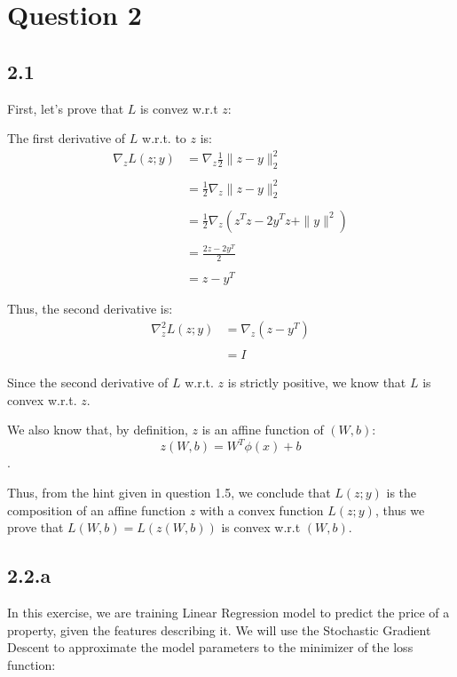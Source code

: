 \documentclass[10pt]{article}
\begin{document}
\newpage
\section{Question 2}
\subsection{2.1}
First, let's prove that $L$ is convez w.r.t $z$:

The first derivative of $L$ w.r.t. to $z$ is:
\begin{equation}
\begin{aligned}
  \nabla_{z} L(z; y) {} & = \nabla_{z}\frac{1}{2}\|z-y\|^{2}_{2}
  \\ \\ &
  = \frac{1}{2} \nabla_{z}\|z-y\|^{2}_{2}
  \\ \\ &
  = \frac{1}{2} \nabla_{z}(z^{T}z - 2y^{T}z + \|y\|^{2})
  \\ \\ &
  = \frac{2z - 2y^{T}}{2}
  \\ \\ &
  = z - y^{T}
\end{aligned}
\end{equation}

Thus, the second derivative is:
\begin{equation}
\begin{aligned}
  \nabla^{2}_{z} L(z; y) {} & = \nabla_{z}(z - y^{T})
  \\ \\ &
  = I
\end{aligned}
\end{equation}

Since the second derivative of $L$ w.r.t. $z$ is strictly positive, we know that $L$ is convex w.r.t. $z$.

We also know that, by definition, $z$ is an affine function of $(W, b)$: $$z(W, b) = W^{T}\phi(x) + b$$.

Thus, from the hint given in question 1.5, we conclude that $L(z; y)$ is the composition of an affine function $z$ with a convex function $L(z; y)$, thus we prove that $L(W, b) = L(z(W, b))$ is convex w.r.t $(W, b)$.

\newpage
\subsection{2.2.a}

In this exercise, we are training Linear Regression model to predict the price of a property, given the features describing it. We will use the Stochastic Gradient Descent to approximate the model parameters to the minimizer of the loss function:
\end{document}
